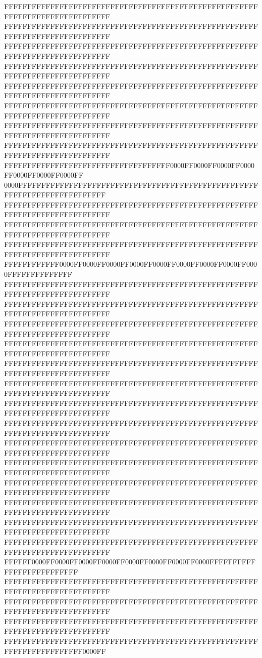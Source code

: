 FFFFFFFFFFFFFFFFFFFFFFFFFFFFFFFFFFFFFFFFFFFFFFFFFFFFFFFFFFFFFFFFFFFFFFFFFFFFFF
FFFFFFFFFFFFFFFFFFFFFFFFFFFFFFFFFFFFFFFFFFFFFFFFFFFFFFFFFFFFFFFFFFFFFFFFFFFFFF
FFFFFFFFFFFFFFFFFFFFFFFFFFFFFFFFFFFFFFFFFFFFFFFFFFFFFFFFFFFFFFFFFFFFFFFFFFFFFF
FFFFFFFFFFFFFFFFFFFFFFFFFFFFFFFFFFFFFFFFFFFFFFFFFFFFFFFFFFFFFFFFFFFFFFFFFFFFFF
FFFFFFFFFFFFFFFFFFFFFFFFFFFFFFFFFFFFFFFFFFFFFFFFFFFFFFFFFFFFFFFFFFFFFFFFFFFFFF
FFFFFFFFFFFFFFFFFFFFFFFFFFFFFFFFFFFFFFFFFFFFFFFFFFFFFFFFFFFFFFFFFFFFFFFFFFFFFF
FFFFFFFFFFFFFFFFFFFFFFFFFFFFFFFFFFFFFFFFFFFFFFFFFFFFFFFFFFFFFFFFFFFFFFFFFFFFFF
FFFFFFFFFFFFFFFFFFFFFFFFFFFFFFFFFFFFFFFFFFFFFFFFFFFFFFFFFFFFFFFFFFFFFFFFFFFFFF
FFFFFFFFFFFFFFFFFFFFFFFFFFFFFFFFFFFF0000FF0000FF0000FF0000FF0000FF0000FF0000FF
0000FFFFFFFFFFFFFFFFFFFFFFFFFFFFFFFFFFFFFFFFFFFFFFFFFFFFFFFFFFFFFFFFFFFFFFFFFF
FFFFFFFFFFFFFFFFFFFFFFFFFFFFFFFFFFFFFFFFFFFFFFFFFFFFFFFFFFFFFFFFFFFFFFFFFFFFFF
FFFFFFFFFFFFFFFFFFFFFFFFFFFFFFFFFFFFFFFFFFFFFFFFFFFFFFFFFFFFFFFFFFFFFFFFFFFFFF
FFFFFFFFFFFFFFFFFFFFFFFFFFFFFFFFFFFFFFFFFFFFFFFFFFFFFFFFFFFFFFFFFFFFFFFFFFFFFF
FFFFFFFFFFFF0000FF0000FF0000FF0000FF0000FF0000FF0000FF0000FF0000FFFFFFFFFFFFFF
FFFFFFFFFFFFFFFFFFFFFFFFFFFFFFFFFFFFFFFFFFFFFFFFFFFFFFFFFFFFFFFFFFFFFFFFFFFFFF
FFFFFFFFFFFFFFFFFFFFFFFFFFFFFFFFFFFFFFFFFFFFFFFFFFFFFFFFFFFFFFFFFFFFFFFFFFFFFF
FFFFFFFFFFFFFFFFFFFFFFFFFFFFFFFFFFFFFFFFFFFFFFFFFFFFFFFFFFFFFFFFFFFFFFFFFFFFFF
FFFFFFFFFFFFFFFFFFFFFFFFFFFFFFFFFFFFFFFFFFFFFFFFFFFFFFFFFFFFFFFFFFFFFFFFFFFFFF
FFFFFFFFFFFFFFFFFFFFFFFFFFFFFFFFFFFFFFFFFFFFFFFFFFFFFFFFFFFFFFFFFFFFFFFFFFFFFF
FFFFFFFFFFFFFFFFFFFFFFFFFFFFFFFFFFFFFFFFFFFFFFFFFFFFFFFFFFFFFFFFFFFFFFFFFFFFFF
FFFFFFFFFFFFFFFFFFFFFFFFFFFFFFFFFFFFFFFFFFFFFFFFFFFFFFFFFFFFFFFFFFFFFFFFFFFFFF
FFFFFFFFFFFFFFFFFFFFFFFFFFFFFFFFFFFFFFFFFFFFFFFFFFFFFFFFFFFFFFFFFFFFFFFFFFFFFF
FFFFFFFFFFFFFFFFFFFFFFFFFFFFFFFFFFFFFFFFFFFFFFFFFFFFFFFFFFFFFFFFFFFFFFFFFFFFFF
FFFFFFFFFFFFFFFFFFFFFFFFFFFFFFFFFFFFFFFFFFFFFFFFFFFFFFFFFFFFFFFFFFFFFFFFFFFFFF
FFFFFFFFFFFFFFFFFFFFFFFFFFFFFFFFFFFFFFFFFFFFFFFFFFFFFFFFFFFFFFFFFFFFFFFFFFFFFF
FFFFFFFFFFFFFFFFFFFFFFFFFFFFFFFFFFFFFFFFFFFFFFFFFFFFFFFFFFFFFFFFFFFFFFFFFFFFFF
FFFFFFFFFFFFFFFFFFFFFFFFFFFFFFFFFFFFFFFFFFFFFFFFFFFFFFFFFFFFFFFFFFFFFFFFFFFFFF
FFFFFFFFFFFFFFFFFFFFFFFFFFFFFFFFFFFFFFFFFFFFFFFFFFFFFFFFFFFFFFFFFFFFFFFFFFFFFF
FFFFFF0000FF0000FF0000FF0000FF0000FF0000FF0000FF0000FFFFFFFFFFFFFFFFFFFFFFFFFF
FFFFFFFFFFFFFFFFFFFFFFFFFFFFFFFFFFFFFFFFFFFFFFFFFFFFFFFFFFFFFFFFFFFFFFFFFFFFFF
FFFFFFFFFFFFFFFFFFFFFFFFFFFFFFFFFFFFFFFFFFFFFFFFFFFFFFFFFFFFFFFFFFFFFFFFFFFFFF
FFFFFFFFFFFFFFFFFFFFFFFFFFFFFFFFFFFFFFFFFFFFFFFFFFFFFFFFFFFFFFFFFFFFFFFFFFFFFF
FFFFFFFFFFFFFFFFFFFFFFFFFFFFFFFFFFFFFFFFFFFFFFFFFFFFFFFFFFFFFFFFFFFFFFFF0000FF
